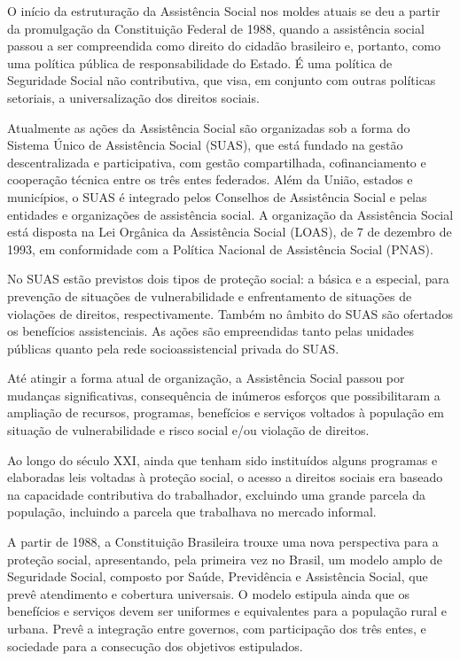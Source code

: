 \documentclass[
  brazilian]{report}
\begin{document}
O início da estruturação da Assistência Social nos moldes atuais se deu
a partir da promulgação da Constituição Federal de 1988, quando a
assistência social passou a ser compreendida como direito do cidadão
brasileiro e, portanto, como uma política pública de responsabilidade do
Estado. É uma política de Seguridade Social não contributiva, que visa,
em conjunto com outras políticas setoriais, a universalização dos
direitos sociais.

Atualmente as ações da Assistência Social são organizadas sob a forma do
Sistema Único de Assistência Social (SUAS), que está fundado na gestão
descentralizada e participativa, com gestão compartilhada,
cofinanciamento e cooperação técnica entre os três entes federados. Além
da União, estados e municípios, o SUAS é integrado pelos Conselhos de
Assistência Social e pelas entidades e organizações de assistência
social. A organização da Assistência Social está disposta na Lei
Orgânica da Assistência Social (LOAS), de 7 de dezembro de 1993, em
conformidade com a Política Nacional de Assistência Social (PNAS).

No SUAS estão previstos dois tipos de proteção social: a básica e a
especial, para prevenção de situações de vulnerabilidade e enfrentamento
de situações de violações de direitos, respectivamente. Também no âmbito
do SUAS são ofertados os benefícios assistenciais. As ações são
empreendidas tanto pelas unidades públicas quanto pela rede
socioassistencial privada do SUAS.

Até atingir a forma atual de organização, a Assistência Social passou
por mudanças significativas, consequência de inúmeros esforços que
possibilitaram a ampliação de recursos, programas, benefícios e serviços
voltados à população em situação de vulnerabilidade e risco social e/ou
violação de direitos.

Ao longo do século XXI, ainda que tenham sido instituídos alguns
programas e elaboradas leis voltadas à proteção social, o acesso a
direitos sociais era baseado na capacidade contributiva do trabalhador,
excluindo uma grande parcela da população, incluindo a parcela que
trabalhava no mercado informal.

A partir de 1988, a Constituição Brasileira trouxe uma nova perspectiva
para a proteção social, apresentando, pela primeira vez no Brasil, um
modelo amplo de Seguridade Social, composto por Saúde, Previdência e
Assistência Social, que prevê atendimento e cobertura universais. O
modelo estipula ainda que os benefícios e serviços devem ser uniformes e
equivalentes para a população rural e urbana. Prevê a integração entre
governos, com participação dos três entes, e sociedade para a consecução
dos objetivos estipulados.
\end{document}
